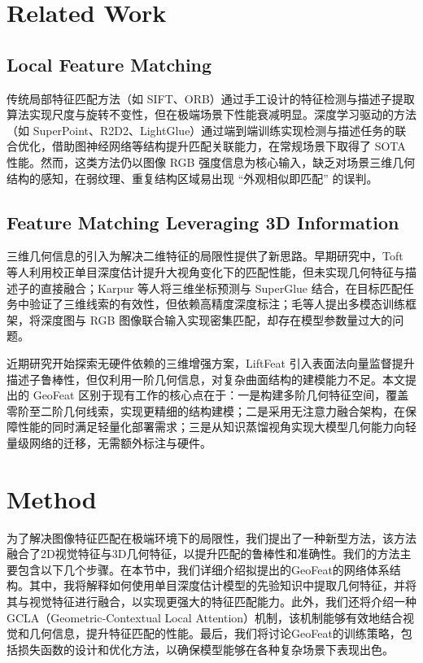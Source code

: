 \documentclass{article}
\begin{document}
	\section{Related Work}
	\subsection{Local Feature Matching}
		\par 传统局部特征匹配方法（如 SIFT、ORB）通过手工设计的特征检测与描述子提取算法实现尺度与旋转不变性，但在极端场景下性能衰减明显。深度学习驱动的方法（如 SuperPoint、R2D2、LightGlue）通过端到端训练实现检测与描述任务的联合优化，借助图神经网络等结构提升匹配关联能力，在常规场景下取得了 SOTA 性能。然而，这类方法仍以图像 RGB 强度信息为核心输入，缺乏对场景三维几何结构的感知，在弱纹理、重复结构区域易出现 “外观相似即匹配” 的误判。
	\subsection{Feature Matching Leveraging 3D Information}
		\par 三维几何信息的引入为解决二维特征的局限性提供了新思路。早期研究中，Toft 等人利用校正单目深度估计提升大视角变化下的匹配性能，但未实现几何特征与描述子的直接融合；Karpur 等人将三维坐标预测与 SuperGlue 结合，在目标匹配任务中验证了三维线索的有效性，但依赖高精度深度标注；毛等人提出多模态训练框架，将深度图与 RGB 图像联合输入实现密集匹配，却存在模型参数量过大的问题。
		\par 近期研究开始探索无硬件依赖的三维增强方案，LiftFeat 引入表面法向量监督提升描述子鲁棒性，但仅利用一阶几何信息，对复杂曲面结构的建模能力不足。本文提出的 GeoFeat 区别于现有工作的核心点在于：一是构建多阶几何特征空间，覆盖零阶至二阶几何线索，实现更精细的结构建模；二是采用无注意力融合架构，在保障性能的同时满足轻量化部署需求；三是从知识蒸馏视角实现大模型几何能力向轻量级网络的迁移，无需额外标注与硬件。
	\section{Method}
		\par 为了解决图像特征匹配在极端环境下的局限性，我们提出了一种新型方法，该方法融合了2D视觉特征与3D几何特征，以提升匹配的鲁棒性和准确性。我们的方法主要包含以下几个步骤。在本节中，我们详细介绍拟提出的GeoFeat的网络体系结构。其中，我将解释如何使用单目深度估计模型的先验知识中提取几何特征，并将其与视觉特征进行融合，以实现更强大的特征匹配能力。此外，我们还将介绍一种GCLA（Geometric-Contextual Local Attention）机制，该机制能够有效地结合视觉和几何信息，提升特征匹配的性能。最后，我们将讨论GeoFeat的训练策略，包括损失函数的设计和优化方法，以确保模型能够在各种复杂场景下表现出色。
\end{document}
